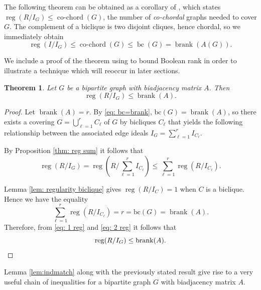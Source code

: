 \documentclass[11pt,letterpaper, reqno]{amsart}
\newtheorem{theorem}{Theorem}[section]
\theoremstyle{definition}
\theoremstyle{remark}
\DeclareMathOperator{\reg}{reg}
\DeclareMathOperator{\bc}{bc}
\DeclareMathOperator{\brank}{brank}
\DeclareMathOperator{\cochord}{co-chord}
\newcommand{\abk}[1]{{\color{blue} ABK: #1}}
\numberwithin{equation}{section}
\begin{document}
The following theorem can be obtained as a corollary of \cite[Theorem 1]{Woodroofe}, which states $\reg(R/I_G) \leq \cochord(G)$, the number of \emph{co-chordal} graphs needed to cover $G$. The complement of a biclique is two disjoint cliques, hence chordal, so we immediately obtain 
\[
\reg(I/I_G) \leq \cochord(G) \leq \bc(G) = \brank(A(G)).
\]

We include a proof of the theorem using  to bound Boolean rank in order to illustrate a technique which will reoccur in later sections. 

\begin{theorem}\label{thm: reg}
Let $G$ be a bipartite graph with biadjacency matrix $A$. Then 
\[
\reg(R/I_G)\leq \brank(A).
\]
\end{theorem}
\begin{proof}
Let $\brank(A)=r$. By \eqref{eq: bc=brank}, $\text{bc}(G)=\brank(A)$, so there exists a covering $G=\bigcup_{\ell=1}^r C_\ell$ of $G$ by bicliques $C_\ell$ that yields the following relationship between the associated edge ideals $I_G=\sum_{\ell=1}^r I_{C_\ell}$.

 By Proposition \ref{thm: reg sum} it follows that 
\begin{equation}\label{eq: 1 reg}
\reg(R/I_G) = \reg\left (R\bigg/\sum_{\ell=1}^r I_{C_\ell} \right ) \leq \sum_{\ell=1}^r \reg(R/I_{C_\ell}).
\end{equation}

Lemma \ref{lem: regularity biclique} gives $\reg(R/I_C)=1$ when $C$ is a biclique. Hence we have the equality 
\begin{equation}\label{eq: 2 reg}
\sum_{\ell=1}^r \reg(R/I_{C_\ell})= r= \text{bc}(G)=\brank(A). 
\end{equation}
Therefore, from \eqref{eq: 1 reg} and \eqref{eq: 2 reg} it follows that
\[
\reg(R/I_G)\leq \brank(A). \qedhere
\]
\end{proof}



Lemma \ref{lem:indmatch} along with the previously stated result give rise to a very useful chain of inequalities for a bipartite graph $G$ with biadjacency matrix $A$.
\end{document}
